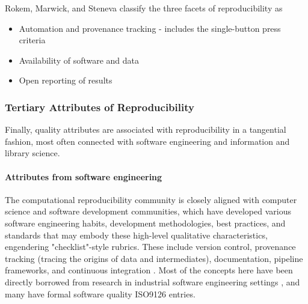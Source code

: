 \documentclass{drexelthesis}
\begin{document}
Rokem, Marwick, and Steneva \cite{Marwick2017-ie} classify the three facets of reproducibility as

\begin{itemize}
	\item Automation and provenance tracking - includes the single-button press criteria

	\item Availability of software and data

	\item Open reporting of results

\end{itemize}
\subsubsection{Tertiary Attributes of Reproducibility}

Finally, quality attributes are associated with reproducibility in a tangential fashion, most often connected with software engineering and information and library science.  

\paragraph{Attributes from software engineering}

The computational reproducibility community is closely aligned with computer science and software development communities, which have developed various software engineering habits,  development methodologies, best practices, and standards that may embody these high-level qualitative characteristics, engendering "checklist"-style rubrics. These include version control, provenance tracking (tracing the origins of data and intermediates), documentation, pipeline frameworks, and continuous integration \cite{Sandve2013-yv,Noble2009-ad}. Most of the concepts here have been directly borrowed from research in industrial software engineering settings \cite{Losavio2004-tg,Technology2003-gl}, and many have formal software quality ISO9126 entries.
\end{document}
